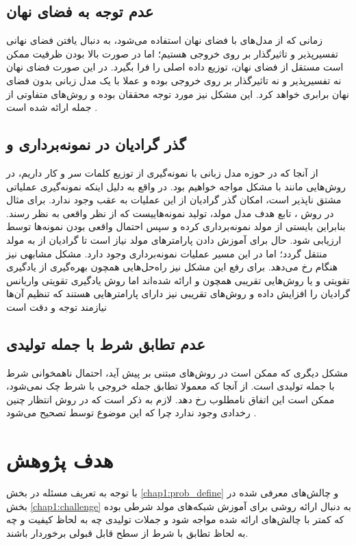 \subsection{عدم توجه به فضای نهان} \label{chap1:latent_ignore}
زمانی که از مدل‌های با فضای نهان استفاده می‌شود، به دنبال یافتن فضای نهانی تفسیرپذیر و تاثیرگذار بر روی خروجی \decoder{} هستیم؛ اما در صورت بالا بودن ظرفیت \decoder{} ممکن است مستقل از فضای نهان، توزیع داده اصلی را فرا بگیرد. در این صورت فضای نهان نه تفسیرپذیر و نه تاثیرگذار بر روی خروجی \decoder{} بوده و عملا با یک مدل زبانی بدون فضای نهان برابری خواهد کرد. این مشکل نیز مورد توجه محققان بوده و روش‌های متفاوتی از جمله \wae{}
  ارائه شده است \cite{wae, infovae, vae_lagging, vae_lossy}.
\subsection{گذر گرادیان در نمونه‌برداری و \argmaxphrase{}}
از آنجا که در حوزه مدل زبانی با نمونه‌گیری از توزیع کلمات سر و کار داریم، در روش‌هایی مانند \gan{} با مشکل مواجه خواهیم بود. در واقع به دلیل اینکه نمونه‌گیری عملیاتی مشتق نا‌پذیر است، امکان گذر گرادیان از این عملیات به عقب وجود ندارد. برای مثال در روش \gan{}، تابع هدف مدل مولد، تولید نمونه‌هاییست که از نظر \discriminator{} واقعی به نظر رسند. بنابراین بایستی از مولد نمونه‌برداری کرده و سپس احتمال واقعی بودن نمونه‌ها توسط \discriminator{} ارزیابی شود. حال برای آموزش دادن پارامتر‌های مولد نیاز است تا گرادیان از \discriminator{} به مولد منتقل گردد؛ اما در این مسیر عملیات نمونه‌برداری وجود دارد. مشکل مشابهی نیز هنگام 
 رخ می‌دهد. برای رفع این مشکل نیز راه‌حل‌هایی همچون بهره‌گیری از یادگیری تقویتی و یا روش‌هایی تقریبی همچون  و  ارائه شده‌اند اما روش یادگیری تقویتی واریانس گرادیان را افزایش داده و روش‌های تقریبی نیز دارای پارامتر‌هایی هستند که تنظیم آن‌ها نیازمند توجه و دقت است \cite{seqgan, gumbel}
\subsection{عدم تطابق شرط با جمله تولیدی}
مشکل دیگری که ممکن است در روش‌های مبتنی بر \likelihood{} پیش آید، احتمال ناهمخوانی شرط با جمله تولیدی است. از آنجا که معمولا تطابق جمله خروجی با شرط چک نمی‌شود، ممکن است این اتفاق نامطلوب رخ دهد. لازم به ذکر است که در روش \gan{} انتظار چنین رخدادی وجود ندارد چرا که این موضوع توسط \discriminator{} تصحیح می‌شود \cite{toward}.
\section{هدف پژوهش}
با توجه به تعریف مسئله در بخش \ref{chap1:prob_define} و چالش‌های معرفی شده در بخش \ref{chap1:challenge} به دنبال ارائه روشی برای آموزش شبکه‌های مولد شرطی بوده که کمتر با چالش‌های ارائه شده مواجه شود و جملات تولیدی چه به لحاظ کیفیت و چه به لحاظ تطابق با شرط از سطح قابل قبولی برخوردار باشند.

